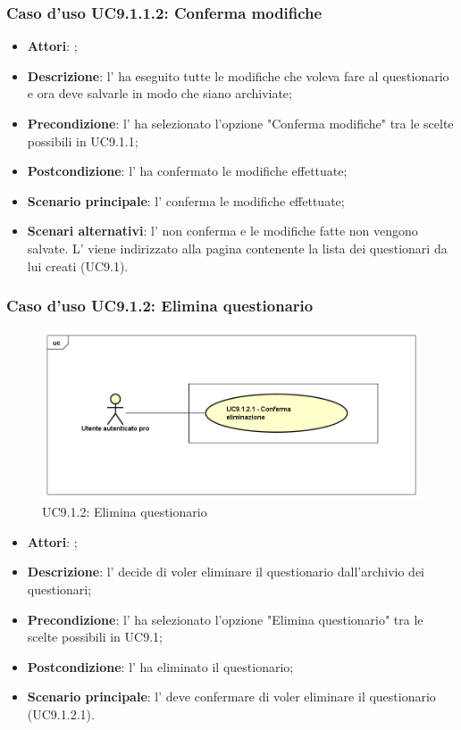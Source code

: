 					\subsubsection{Caso d'uso UC9.1.1.2: Conferma modifiche}
					\label{UC9.1.1.2}
					\begin{itemize}
						\item \textbf{Attori}: \uaupro{};
						\item \textbf{Descrizione}: l'\uaupro{} ha eseguito tutte le modifiche che voleva fare al questionario e ora deve salvarle in modo che siano archiviate;
						\item \textbf{Precondizione}: l'\uaupro{} ha selezionato l'opzione "Conferma modifiche" tra le scelte possibili in UC9.1.1;
						\item \textbf{Postcondizione}: l'\uaupro{} ha confermato le modifiche effettuate;
						\item \textbf{Scenario principale}: l'\uaupro{} conferma le modifiche effettuate;
						\item \textbf{Scenari alternativi}: l'\uaupro{} non conferma e le modifiche fatte non vengono salvate. L'\uaupro{} viene indirizzato alla pagina contenente la lista dei questionari da lui creati (UC9.1).
					\end{itemize}
										
			\subsubsection{Caso d'uso UC9.1.2: Elimina questionario}
			\label{UC9.1.2}
			\begin{figure}[h]
				\centering
			\includegraphics[scale=0.5,keepaspectratio]{UML/UC9_1_2.png}
				\caption{UC9.1.2: Elimina questionario}
			\end{figure}
			\FloatBarrier
			\begin{itemize}
				\item \textbf{Attori}: \uaupro{};
				\item \textbf{Descrizione}: l'\uaupro{} decide di voler eliminare il questionario dall'archivio dei questionari;
				\item \textbf{Precondizione}: l'\uaupro{} ha selezionato l'opzione "Elimina questionario" tra le scelte possibili in UC9.1;
				\item \textbf{Postcondizione}: l'\uaupro{} ha eliminato il questionario;
				\item \textbf{Scenario principale}: l'\uaupro{} deve confermare di voler eliminare il questionario (UC9.1.2.1).
			\end{itemize}
			
